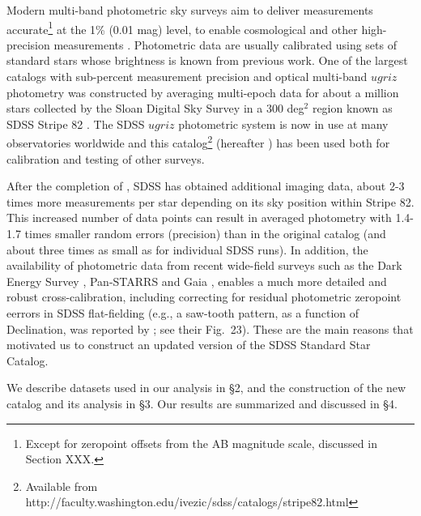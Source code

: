 
Modern multi-band photometric sky surveys aim to deliver measurements accurate\footnote{Except for zeropoint offsets from the AB magnitude scale, discussed in Section XXX.} at the 1\% (0.01 mag) level, to 
enable cosmological and other high-precision measurements \cite[e.g., the Vera Rubin Observatory Legacy Survey of Space and Time,][]{LSSToverview}. 
Photometric data are usually calibrated using sets of standard stars whose brightness is known from previous work.
One of the largest catalogs with sub-percent measurement precision and optical multi-band $ugriz$ photometry
was constructed by averaging multi-epoch data for about a million stars collected by the Sloan Digital Sky Survey \citep[SDSS,][]{York2000}  in a 300 deg$^2$ region known as SDSS Stripe 82 \citep[][hereafter \pO]{Ivez07}. 
The SDSS $ugriz$ photometric system is now in use at many observatories worldwide and this catalog\footnote{Available from http://faculty.washington.edu/ivezic/sdss/catalogs/stripe82.html}
(hereafter \pOc) has been used both for calibration and testing of other surveys. 

After the completion of \pOc, SDSS has obtained additional imaging data, about 2-3 times more measurements 
per star depending on its sky position within Stripe 82. This increased number of data points can result in averaged photometry with
1.4-1.7 times smaller random errors (precision) than in the original catalog (and about three times as small as for individual 
SDSS runs). In addition, the availability of photometric data from recent wide-field surveys such as the 
Dark Energy Survey \citep{2016MNRAS.460.1270D}, Pan-STARRS \citep{2010SPIE.7733E..0EK} and Gaia \citep{2018A&A...616A...1G}, enables a much more  
detailed and robust cross-calibration, including
correcting for residual photometric zeropoint eerrors in SDSS flat-fielding (e.g., a saw-tooth pattern, as a function of Declination,
was reported by \citealt{2013A&A...552A.124B}; see their Fig.~23). These are the main reasons that motivated us to construct an updated version of the SDSS Standard Star Catalog.
 

We describe datasets used in our analysis in \S2, and the construction of the new catalog and its analysis in \S3. Our results are summarized and discussed in \S4. 